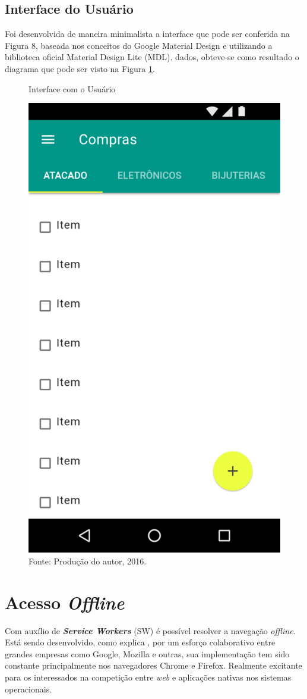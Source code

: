 \documentclass[
	12pt,
	openright,
	oneside, %
	a4paper,
	chapter=TITLE,
	section=TITLE,
	english,
	brazil %
	]{abntex2-udesc}
\begin{document}
\subsection{Interface do Usuário}

Foi desenvolvida de maneira minimalista a interface que pode ser conferida na Figura 8, baseada nos conceitos do Google Material Design e utilizando a biblioteca oficial Material Design Lite (MDL).
 dados, obteve-se como resultado o diagrama que pode ser visto na Figura \ref{fig:ui}.

\begin{figure}[h]
\caption{Interface com o Usuário}\label{fig:ui}
\centering
\includegraphics[width=.5\textwidth,keepaspectratio]{figures/buyer.pdf}
\caption*{\footnotesize Fonte: Produção do autor, 2016.}
\end{figure}

\section{Acesso \textit{Offline}}

Com auxílio de \textbf{\textit{Service Workers}} (SW) é possível resolver a navegação \textit{offline}. Está sendo desenvolvido, como explica , por um esforço colaborativo entre grandes empresas como Google, Mozilla e outras, sua implementação tem sido constante principalmente nos navegadores Chrome e Firefox. Realmente excitante para os interessados na competição entre \textit{web} e aplicações nativas nos sistemas operacionais.
\end{document}
